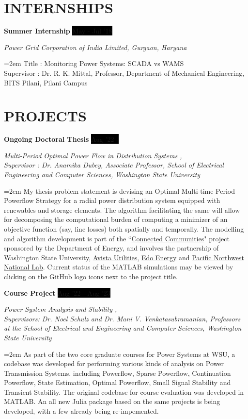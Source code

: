 \documentclass[paper=a4,fontsize=11pt]{scrartcl} %
\newcommand{\sepspace}{\vspace*{1em}}		%
\newcommand{\NewPart}[1]{\section*{\uppercase{#1}}}
\newcommand{\EducationEntry}[4]{
		\noindent \textbf{#1} \hfill      %
		\colorbox{Black}{%
			\parbox{10em}{%
			\hfill\color{White}#2}} \par  %
		\noindent \textit{#3} \par        %
		\noindent\hangindent=2em\hangafter=0 \small #4 %
		\normalsize \par}
\newcommand{\WorkEntry}[4]{				  %
		\noindent \textbf{#1} \hfill      %
		\colorbox{Black}{\color{White}#2} \par  %
		\noindent \textit{#3} \par              %
		\noindent\hangindent=2em\hangafter=0 \small #4 %
		\normalsize \par}
\begin{document}
\NewPart{Internships}{}

\WorkEntry{Summer Internship}{May - Jul '18}{Power Grid Corporation of India Limited, Gurgaon, Haryana}{Title : Monitoring Power Systems: SCADA vs WAMS\\Supervisor : Dr. R. K. Mittal, Professor, Department of Mechanical Engineering, BITS Pilani, Pilani Campus}

\NewPart{Projects}{}

\WorkEntry{Ongoing Doctoral Thesis}{Aug '22 - }{Multi-Period Optimal Power Flow in Distribution Systems \href{https://github.com/Realife-Brahmin/MultiPeriod-DistOPF-Benchmark}{\textcolor{matlaborange}{\faGithub}}, \href{https://github.com/Realife-Brahmin/MultiPeriod-DistOPF-AlgoTesting}{\textcolor{matlaborange}{\faGithub}}\\ Supervisor : Dr. Anamika Dubey, Associate Professor, School of Electrical Engineering and Computer Sciences, Washington State University}{My thesis problem statement is devising an Optimal Multi-time Period Powerflow Strategy for a radial power distribution system equipped with renewables and storage elements. The algorithm facilitating the same will allow for decomposing the computational burden of computing a minimizer of an objective function (say, line losses) both spatially and temporally. The modelling and algorithm development is part of the ``\href{https://www.energy.gov/eere/solar/connected-communities-funding-program}{Connected Communities}" project sponsored by the Department of Energy, and involves the partnership of Washington State University, \href{https://investor.avistacorp.com/}{Avista Utilities}, \href{https://edoenergy.com/about-edo/}{Edo Energy} and \href{https://www.pnnl.gov/about}{Pacific Northwest National Lab}. Current status of the MATLAB simulations may be viewed by clicking on the GitHub logo icons next to the project title.}

\sepspace 

\WorkEntry{Course Project}{Aug '22 - Aug '23}{Power System Analysis and Stability \href{https://github.com/Realife-Brahmin/PowerSystems-Analysis-Stability-WSU}{\textcolor{matlaborange}{\faGithub}}, \href{https://github.com/ninadkgaikwad/PowerEdu}{\textcolor{juliapurple}{ \faGithub }} \\ Supervisors: Dr. Noel Schulz and Dr. Mani V. Venkatasubramanian, Professors at the School of Electrical and Engineering and Computer Sciences, Washington State University}{As part of the two core graduate courses for Power Systems at WSU, a codebase was developed for performing various kinds of analysis on Power Transmission Systems, including Powerflow, Sparse Powerflow, Continuation Powerflow, State Estimation, Optimal Powerflow, Small Signal Stability and Transient Stability. The original codebase for course evaluation was developed in MATLAB. An all new Julia package based on the same projects is being developed, with a few already being re-impemented.}
\end{document}
